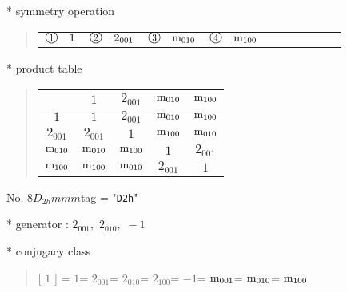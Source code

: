 \documentclass[fleqn,10pt,landscape]{jsarticle}
\begin{document}
* symmetry operation
\begin{quote}
\begin{tabular}{llllllllll}
$ {\ooalign{\hfil\resizebox{.8\width}{\height}{1}\hfil\crcr\raise.1ex\hbox{\large$\bigcirc$}}}\quad 1 $ & $ {\ooalign{\hfil\resizebox{.8\width}{\height}{2}\hfil\crcr\raise.1ex\hbox{\large$\bigcirc$}}}\quad 2{}_{001} $ & $ {\ooalign{\hfil\resizebox{.8\width}{\height}{3}\hfil\crcr\raise.1ex\hbox{\large$\bigcirc$}}}\quad {\rm m}_{010} $ & $ {\ooalign{\hfil\resizebox{.8\width}{\height}{4}\hfil\crcr\raise.1ex\hbox{\large$\bigcirc$}}}\quad {\rm m}_{100} $
\end{tabular}
\end{quote}

* product table
\begin{quote}
\begin{tabular}{ccccc} \hline \hline
 & $ 1 $ & $ 2{}_{001} $ & $ {\rm m}_{010} $ & $ {\rm m}_{100} $ \\ \hline
$ 1 $ & $ 1 $ & $ 2{}_{001} $ & $ {\rm m}_{010} $ & $ {\rm m}_{100} $ \\
$ 2{}_{001} $ & $ 2{}_{001} $ & $ 1 $ & $ {\rm m}_{100} $ & $ {\rm m}_{010} $ \\
$ {\rm m}_{010} $ & $ {\rm m}_{010} $ & $ {\rm m}_{100} $ & $ 1 $ & $ 2{}_{001} $ \\
$ {\rm m}_{100} $ & $ {\rm m}_{100} $ & $ {\rm m}_{010} $ & $ 2{}_{001} $ & $ 1 $ \\
 \hline \hline
\end{tabular}
\end{quote}

\newpage

No. 8\quad$D_{2h}$\quad$mmm$\quad[ orthorhombic ]
tag = "{\tt D2h}"

* generator : $2{}_{001},\,\,2{}_{010},\,\,-1$

* conjugacy class
\begin{quote}
[ $1$ ] = \quad $1$\newline[ $2{}_{001}$ ] = \quad $2{}_{001}$\newline[ $2{}_{010}$ ] = \quad $2{}_{010}$\newline[ $2{}_{100}$ ] = \quad $2{}_{100}$\newline[ $-1$ ] = \quad $-1$\newline[ ${\rm m}_{001}$ ] = \quad ${\rm m}_{001}$\newline[ ${\rm m}_{010}$ ] = \quad ${\rm m}_{010}$\newline[ ${\rm m}_{100}$ ] = \quad ${\rm m}_{100}$\newline
\end{quote}
\end{document}
